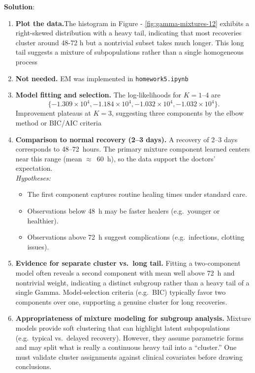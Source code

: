 \documentclass[submit]{../harvardml}
\newenvironment{solution}{
    \vspace{2mm}
    \color{blue}\noindent\textbf{Solution}:
}{}
\begin{document}
\begin{solution}
\begin{enumerate}
\item \textbf{Plot the data.}The histogram in Figure - \ref{fig:gamma-mixtures-12} exhibits a right-skewed distribution with a heavy tail, indicating that most recoveries cluster around 48-72 h but a nontrivial subset takes much longer. This long tail suggests a mixture of subpopulations rather than a single homogeneous process

\item \textbf{Not needed.} EM was implemented in \texttt{homework5.ipynb}

\item \textbf{Model fitting and selection.} The log‑likelihoods for $K=1$–4 are
\[
\{-1.309\times10^4, -1.184\times10^4, -1.032\times10^4, -1.032\times10^4\}.
\]
Improvement plateaus at $K=3$, suggesting three components by the elbow method or BIC/AIC criteria

\setcounter{enumi}{3}
\item \textbf{Comparison to normal recovery (2–3 days).}  
  A recovery of 2–3 days corresponds to 48–72 hours.  The primary mixture component learned centers near this range (mean $\approx$ 60 h), so the data support the doctors’ expectation.  \\
  \textit{Hypotheses:}  
  \begin{itemize}
    \item The first component captures routine healing times under standard care.  
    \item Observations below 48 h may be faster healers (e.g.\ younger or healthier).  
    \item Observations above 72 h suggest complications (e.g.\ infections, clotting issues).
  \end{itemize}

\item \textbf{Evidence for separate cluster vs.\ long tail.}  
  Fitting a two‐component model often reveals a second component with mean well above 72 h and nontrivial weight, indicating a distinct subgroup rather than a heavy tail of a single Gamma.  Model‐selection criteria (e.g.\ BIC) typically favor two components over one, supporting a genuine cluster for long recoveries.

\item \textbf{Appropriateness of mixture modeling for subgroup analysis.}  
  Mixture models provide soft clustering that can highlight latent subpopulations (e.g.\ typical vs.\ delayed recovery).  However, they assume parametric forms and may split what is really a continuous heavy tail into a “cluster.”  One must validate cluster assignments against clinical covariates before drawing conclusions.


\end{enumerate}
\end{solution}
\end{document}
